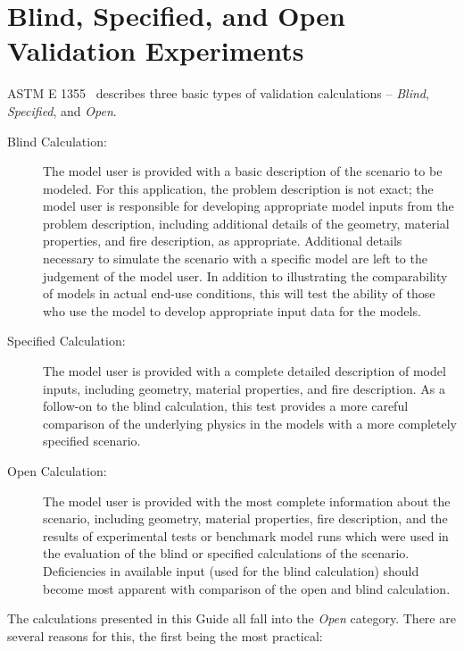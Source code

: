 \section{Blind, Specified, and Open Validation Experiments}

ASTM E 1355~\cite{ASTM:E1355} describes three basic types of validation calculations -- {\em Blind}, {\em Specified}, and
{\em Open}.
\begin{description}
\item [Blind Calculation:] The model user is provided with
a basic description of the scenario to be modeled. For this
application, the problem description is not exact; the model
user is responsible for developing appropriate model inputs
from the problem description, including additional details of
the geometry, material properties, and fire description, as
appropriate. Additional details necessary to simulate the scenario
with a specific model are left to the judgement of the
model user. In addition to illustrating the comparability of
models in actual end-use conditions, this will test the ability of
those who use the model to develop appropriate input data for
the models.
\item [Specified Calculation:] The model user is provided
with a complete detailed description of model inputs, including
geometry, material properties, and fire description. As a
follow-on to the blind calculation, this test provides a more
careful comparison of the underlying physics in the models
with a more completely specified scenario.
\item [Open Calculation:] The model user is provided with
the most complete information about the scenario, including
geometry, material properties, fire description, and the results
of experimental tests or benchmark model runs which were
used in the evaluation of the blind or specified calculations of
the scenario. Deficiencies in available input (used for the blind
calculation) should become most apparent with comparison of
the open and blind calculation.
\end{description}
The calculations presented in this Guide all fall into the {\em Open} category. There are several reasons for this, the first
being the most practical:
